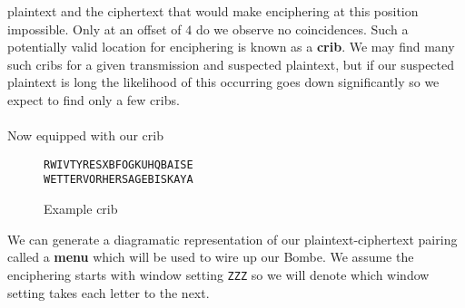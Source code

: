 plaintext and the ciphertext that would make enciphering at this
position impossible. Only at an offset of $4$ do we observe no
coincidences. Such a potentially valid location for enciphering is
known as a {\bf{crib}}. We may find many such cribs for a given
transmission and suspected plaintext, but if our suspected plaintext
is long the likelihood of this occurring goes down significantly so
we expect to find only a few cribs.
\\\\Now equipped with our crib
\begin{figure}[H]
  \begin{center}
    \texttt{RWIVTYRESXBFOGKUHQBAISE}  \\
    \texttt{WETTERVORHERSAGEBISKAYA} \\
  \end{center}
  \caption{Example crib}
  \label{fig:crib}
\end{figure}
\noindent We can generate a diagramatic representation of our
plaintext-ciphertext pairing called a {\bf{menu}} which will be used
to wire up our Bombe. We assume the enciphering starts with window
setting \texttt{ZZZ} so we will denote which window setting takes
each letter to the next.
